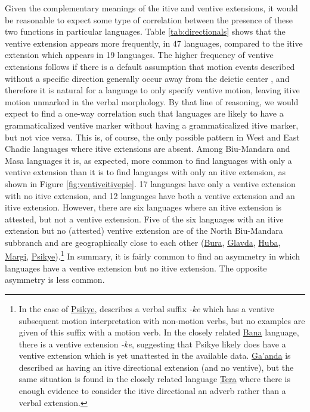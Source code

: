 
Given the complementary meanings of the itive and ventive extensions, it would be reasonable to expect some type of correlation between the presence of these two functions in particular languages. Table \ref{tab:directionals} shows that the ventive extension appears more frequently, in 47 languages, compared to the itive extension which appears in 19 languages. The higher frequency of ventive extensions follows if there is a default assumption that motion events described without a specific direction generally occur away from the deictic center \citep{wilkinsWhenGOMeans1995}, and therefore it is natural for a language to only specify ventive motion, leaving itive motion unmarked in the verbal morphology. By that line of reasoning, we would expect to find a one-way correlation such that languages are likely to have a grammaticalized ventive marker without having a grammaticalized itive marker, but not vice versa. This is, of course, the only possible pattern in West and East Chadic languages where itive extensions are absent. Among Biu-Mandara and Masa languages it is, as expected, more common to find languages with only a ventive extension than it is to find languages with only an itive extension, as shown in Figure \ref{fig:ventiveitivepie}. 17 languages have only a ventive extension with no itive extension, and 12 languages have both a ventive extension and an itive extension. However, there are six languages where an itive extension is attested, but not a ventive extension. Five of the six languages with an itive extension but no (attested) ventive extension are of the North Biu-Mandara subbranch and are geographically close to each other (\hyperref[bura]{Bura}, \hyperref[glav]{Glavda}, \hyperref[huba]{Huba}, \hyperref[marg]{Margi}, \hyperref[psik]{Psikye}).\footnote{In the case of \hyperref[psik]{Psikye}, \citet[113--114]{smithKapsikiLanguage1969} describes a verbal suffix \textit{-ke} which has a ventive subsequent motion interpretation with non-motion verbs, but no examples are given of this suffix with a motion verb. In the closely related \hyperref[bana]{Bana} language, there is a ventive extension \textit{-ke}, suggesting that Psikye likely does have a ventive extension which is yet unattested in the available data. \hyperref[gaan]{Ga'anda} is described as having an itive directional extension (and no ventive), but the same situation is found in the closely related language \hyperref[tera]{Tera} where there is enough evidence to consider the itive directional an adverb rather than a verbal extension.} In summary, it is fairly common to find an asymmetry in which languages have a ventive extension but no itive extension. The opposite asymmetry is less common.

